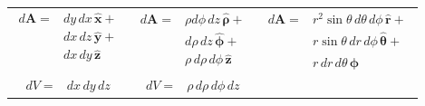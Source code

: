 \documentclass[letterpaper,landscape,10pt]{article}
\begin{document}
{\begin{multicols}{3}
\begin{center}
\begin{tabular}{ c  c  c }
			\vspace{-4pt}
			\parbox[t]{.9in}{\vspace{-15pt}
				\begin{equation*}\begin{split}
					d\bm{\mathbf{A}} =& dy\, dx\, \bm{\hat{x}} + \\
						&dx\, dz\, \bm{\hat{y}} + \\
						&dx\, dy\, \bm{\hat{z}}
				\end{split}\end{equation*} } &

			\parbox[t]{.9in}{\vspace{-15pt}
				\begin{equation*}\begin{split}
					d\bm{\mathbf{A}} =& \rho d\phi\, dz\, \bm{\hat{\rho}} + \\
						&d\rho\, dz\, \bm{\hat{\phi}} + \\
						&\rho\, d\rho\, d\phi\, \bm{\hat{z}}
				\end{split}\end{equation*} } &

			\parbox[t]{.9in}{\vspace{-15pt}
				\begin{equation*}\begin{split}
					d\bm{\mathbf{A}} =& r^2\sin\theta \, d\theta \, d\phi \,
							\bm{\hat{r}} + \\
						&r\sin\theta\, dr \, d\phi \, \bm{\hat{\theta}} + \\
						& r \, dr \, d\theta \, \bm{\hat{\phi}}
				\end{split}\end{equation*} } \\

			\vspace{-8pt}
			\parbox[t]{.9in}{\vspace{-15pt}
				\begin{equation*}\begin{split}
					dV =& dx \, dy \, dz
				\end{split}\end{equation*} } &

			\parbox[t]{.9in}{\vspace{-15pt}
				\begin{equation*}\begin{split}
					dV =& \rho \, d\rho \, d\phi \, dz
				\end{split}\end{equation*} } &


\end{tabular}
\end{center}
\end{multicols}}
\end{document}
